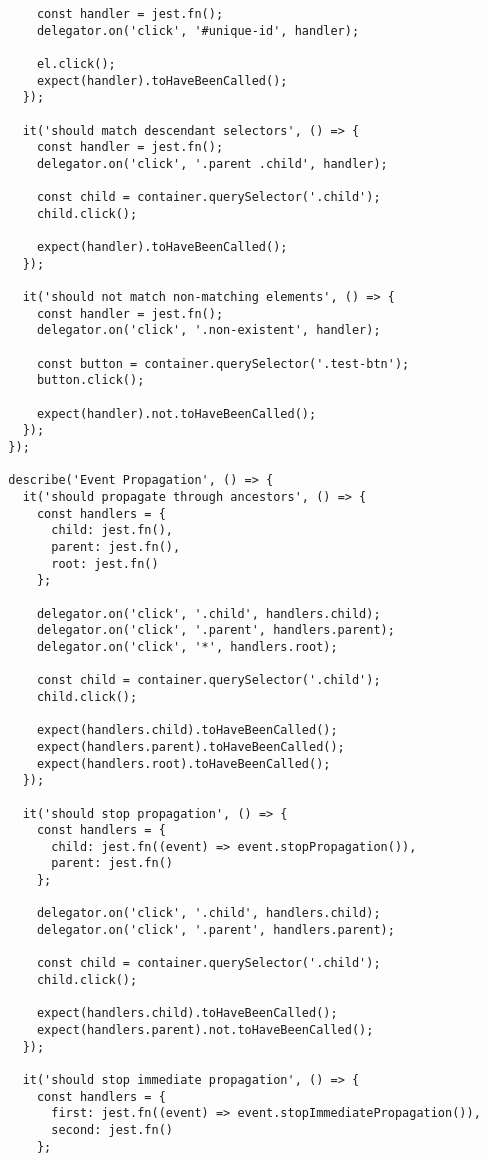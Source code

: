 \documentclass[11pt]{article}
\begin{document}
\begin{verbatim}
      const handler = jest.fn();
      delegator.on('click', '#unique-id', handler);
      
      el.click();
      expect(handler).toHaveBeenCalled();
    });
    
    it('should match descendant selectors', () => {
      const handler = jest.fn();
      delegator.on('click', '.parent .child', handler);
      
      const child = container.querySelector('.child');
      child.click();
      
      expect(handler).toHaveBeenCalled();
    });
    
    it('should not match non-matching elements', () => {
      const handler = jest.fn();
      delegator.on('click', '.non-existent', handler);
      
      const button = container.querySelector('.test-btn');
      button.click();
      
      expect(handler).not.toHaveBeenCalled();
    });
  });
  
  describe('Event Propagation', () => {
    it('should propagate through ancestors', () => {
      const handlers = {
        child: jest.fn(),
        parent: jest.fn(),
        root: jest.fn()
      };
      
      delegator.on('click', '.child', handlers.child);
      delegator.on('click', '.parent', handlers.parent);
      delegator.on('click', '*', handlers.root);
      
      const child = container.querySelector('.child');
      child.click();
      
      expect(handlers.child).toHaveBeenCalled();
      expect(handlers.parent).toHaveBeenCalled();
      expect(handlers.root).toHaveBeenCalled();
    });
    
    it('should stop propagation', () => {
      const handlers = {
        child: jest.fn((event) => event.stopPropagation()),
        parent: jest.fn()
      };
      
      delegator.on('click', '.child', handlers.child);
      delegator.on('click', '.parent', handlers.parent);
      
      const child = container.querySelector('.child');
      child.click();
      
      expect(handlers.child).toHaveBeenCalled();
      expect(handlers.parent).not.toHaveBeenCalled();
    });
    
    it('should stop immediate propagation', () => {
      const handlers = {
        first: jest.fn((event) => event.stopImmediatePropagation()),
        second: jest.fn()
      };
      

\end{verbatim}
\end{document}
